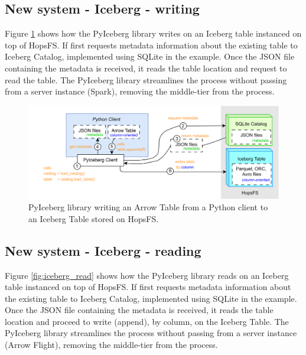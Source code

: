 \subsection{New system - Iceberg - writing}
\label{subsec:back_sys_iceberg_write}

Figure \ref{fig:iceberg_write} shows how the PyIceberg library writes on an Iceberg table instanced on top of \gls{HopsFS}. If first requests metadata information about the existing table to Iceberg Catalog, implemented using SQLite in the example. Once the JSON file containing the metadata is received, it reads the table location and request to read the table. The PyIceberg library streamlines the process without passing from a server instance (Spark), removing the middle-tier from the process.

\begin{figure}
    \begin{center}
      \includegraphics[width=\textwidth]{figures/2-background_and_related_work/iceberg_write.png}
    \end{center}
    \caption[New system - Iceberg - write process]{PyIceberg library writing an Arrow Table from a Python client to an Iceberg Table stored on \gls{HopsFS}.}
    \label{fig:iceberg_write}
\end{figure}



\subsection{New system - Iceberg - reading}
\label{subsec:back_sys_iceberg_read}

Figure \ref{fig:iceberg_read} shows how the PyIceberg library reads on an Iceberg table instanced on top of \gls{HopsFS}. If first requests metadata information about the existing table to Iceberg Catalog, implemented using SQLite in the example. Once the JSON file containing the metadata is received, it reads the table location and proceed to write (append), by column, on the Iceberg Table. The PyIceberg library streamlines the process without passing from a server instance (Arrow Flight), removing the middle-tier from the process.

